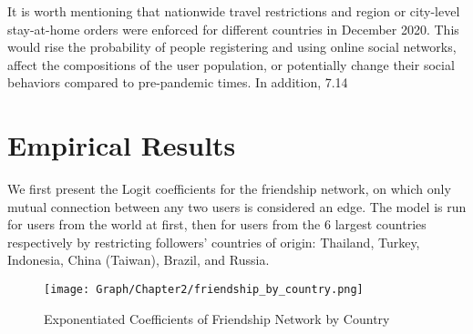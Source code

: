 It is worth mentioning that nationwide travel restrictions and region or city-level stay-at-home orders were enforced for different countries in December 2020. This would rise the probability of people registering and using online social networks, affect the compositions of the user population, or potentially change their social behaviors compared to pre-pandemic times. In addition, 7.14\
\section{Empirical Results}

We first present the Logit coefficients for the friendship network, on which only mutual connection between any two users is considered an edge. The model is run for users from the world at first, then for users from the 6 largest countries respectively by restricting followers' countries of origin: Thailand, Turkey, Indonesia, China (Taiwan), Brazil, and Russia.

\begin{figure} \centering
  \texttt{[image: Graph/Chapter2/friendship\_by\_country.png]}
    \caption{Exponentiated Coefficients of Friendship Network by Country}
\end{figure}


